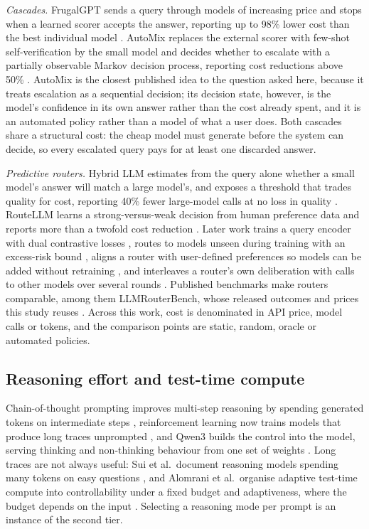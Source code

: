 \documentclass[final,5p,times,twocolumn]{elsarticle}
\theoremstyle{plain}
\begin{document}
\emph{Cascades.} FrugalGPT sends a query through models of increasing price
and stops when a learned scorer accepts the answer, reporting up to 98\%
lower cost than the best individual model \cite{chen2023frugalgpt}. AutoMix
replaces the external scorer with few-shot self-verification by the small
model and decides whether to escalate with a partially observable Markov
decision process, reporting cost reductions above 50\%
\cite{aggarwal2024automix}. AutoMix is the closest published idea to the
question asked here, because it treats escalation as a sequential decision;
its decision state, however, is the model's confidence in its own answer
rather than the cost already spent, and it is an automated policy rather than
a model of what a user does. Both cascades share a structural cost: the cheap
model must generate before the system can decide, so every escalated query
pays for at least one discarded answer.

\emph{Predictive routers.} Hybrid LLM estimates from the query alone whether
a small model's answer will match a large model's, and exposes a threshold
that trades quality for cost, reporting 40\% fewer large-model calls at no
loss in quality \cite{ding2024hybridllm}. RouteLLM learns a strong-versus-weak
decision from human preference data and reports more than a twofold cost
reduction \cite{ong2024routellm}. Later work trains a query encoder
with dual contrastive losses \cite{chen2024routerdc}, routes to models unseen
during training with an excess-risk bound \cite{jitkrittum2025universal},
aligns a router with user-defined preferences so models can be added without
retraining \cite{tran2025archrouter}, and interleaves a router's own
deliberation with calls to other models over several rounds
\cite{zhang2025routerr1}. Published benchmarks make routers comparable, among
them LLMRouterBench, whose released outcomes and prices this study reuses
\cite{li2026llmrouterbench}. Across this work, cost is denominated in API
price, model calls or tokens, and the comparison points are static, random,
oracle or automated policies.

\subsection{Reasoning effort and test-time compute}
\label{sec:related-reasoning}

Chain-of-thought prompting improves multi-step reasoning by spending
generated tokens on intermediate steps \cite{wei2022cot}, reinforcement
learning now trains models that produce long traces unprompted
\cite{deepseek2025r1}, and Qwen3 builds the control into the model, serving
thinking and non-thinking behaviour from one set of weights \cite{qwen3}.
Long traces are not always useful: Sui
et al.\ document reasoning models spending many tokens on easy questions
\cite{sui2025stopoverthinking}, and Alomrani et al.\ organise adaptive
test-time compute into controllability under a fixed budget and adaptiveness,
where the budget depends on the input \cite{alomrani2025reasoningbudget}.
Selecting a reasoning mode per prompt is an instance of the second tier.
\end{document}

